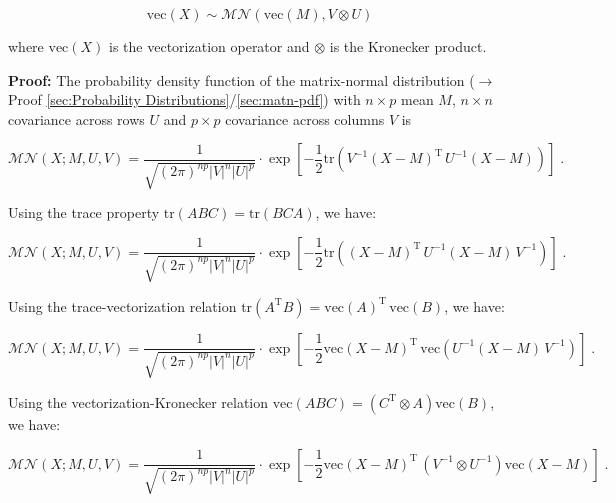 \documentclass[a4paper,12pt,twoside]{book}
\begin{document}
\begin{equation} \label{eq:matn-mvn-mvn}
\mathrm{vec}(X) \sim \mathcal{MN}(\mathrm{vec}(M), V \otimes U)
\end{equation}

where $\mathrm{vec}(X)$ is the vectorization operator and $\otimes$ is the Kronecker product.


\vspace{1em}
\textbf{Proof:} The probability density function of the matrix-normal distribution ($\rightarrow$ Proof \ref{sec:Probability Distributions}/\ref{sec:matn-pdf}) with $n \times p$ mean $M$, $n \times n$ covariance across rows $U$ and $p \times p$ covariance across columns $V$ is

\begin{equation} \label{eq:matn-mvn-matn-pdf}
\mathcal{MN}(X; M, U, V) = \frac{1}{\sqrt{(2\pi)^{np} |V|^n |U|^p}} \cdot \exp\left[-\frac{1}{2} \mathrm{tr}\left( V^{-1} (X-M)^\mathrm{T} \, U^{-1} (X-M) \right) \right] \; .
\end{equation}

Using the trace property $\mathrm{tr}(ABC) = \mathrm{tr}(BCA)$, we have:

\begin{equation} \label{eq:matn-mvn-matn-mvn-s1}
\mathcal{MN}(X; M, U, V) = \frac{1}{\sqrt{(2\pi)^{np} |V|^n |U|^p}} \cdot \exp\left[-\frac{1}{2} \mathrm{tr}\left( (X-M)^\mathrm{T} \, U^{-1} (X-M) \, V^{-1} \right) \right] \; .
\end{equation}

Using the trace-vectorization relation $\mathrm{tr}(A^\mathrm{T} B) = \mathrm{vec}(A)^\mathrm{T} \, \mathrm{vec}(B)$, we have:

\begin{equation} \label{eq:matn-mvn-matn-mvn-s2}
\mathcal{MN}(X; M, U, V) = \frac{1}{\sqrt{(2\pi)^{np} |V|^n |U|^p}} \cdot \exp\left[-\frac{1}{2} \mathrm{vec}(X-M)^\mathrm{T} \, \mathrm{vec}\left( U^{-1} (X-M) \, V^{-1} \right) \right] \; .
\end{equation}

Using the vectorization-Kronecker relation $\mathrm{vec}(ABC) = \left( C^\mathrm{T} \otimes A \right) \mathrm{vec}(B)$, we have:

\begin{equation} \label{eq:matn-mvn-matn-mvn-s3}
\mathcal{MN}(X; M, U, V) = \frac{1}{\sqrt{(2\pi)^{np} |V|^n |U|^p}} \cdot \exp\left[-\frac{1}{2} \mathrm{vec}(X-M)^\mathrm{T} \, \left( V^{-1} \otimes U^{-1} \right) \mathrm{vec}(X-M) \right] \; .
\end{equation}
\end{document}
